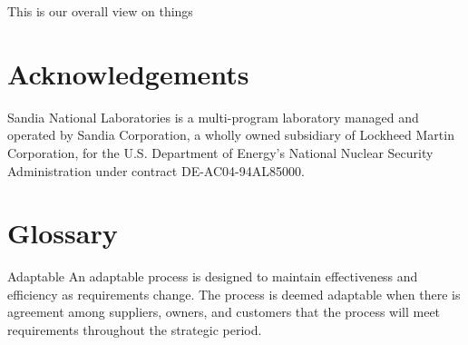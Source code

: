 This is our overall view on things

\section*{Acknowledgements}
Sandia National Laboratories is a multi-program laboratory managed and operated
by Sandia Corporation, a wholly owned subsidiary of Lockheed Martin
Corporation, for the U.S. Department of Energy's National Nuclear Security
Administration under contract DE-AC04-94AL85000.



\section{Glossary}
\begin{Glossary}
\item[Adaptable] An adaptable process is designed to maintain effectiveness and
efficiency as requirements change. The process is deemed adaptable when there
is agreement among suppliers, owners, and customers that the process will meet
requirements throughout the strategic period.
\end{Glossary}

